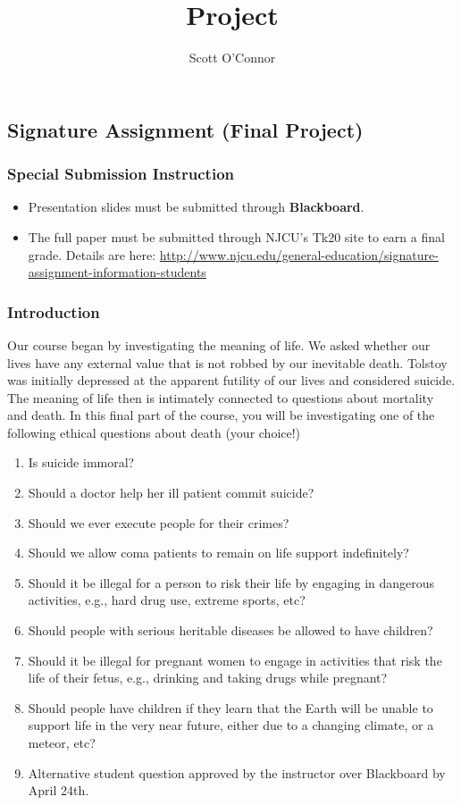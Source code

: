 \documentclass[]{article}
\title{Project}
\author{Scott O’Connor}
\providecommand{\tightlist}{%
  \setlength{\itemsep}{0pt}\setlength{\parskip}{0pt}}
\begin{document}
\subsection{Signature Assignment (Final
Project)}\label{signature-assignment-final-project}

\subsubsection{Special Submission
Instruction}\label{special-submission-instruction}

\begin{itemize}
\tightlist
\item
  Presentation slides must be submitted through \textbf{Blackboard}.
\item
  The full paper must be submitted through NJCU's Tk20 site to earn a
  final grade. Details are here:
  \url{http://www.njcu.edu/general-education/signature-assignment-information-students}
\end{itemize}

\subsubsection{Introduction}\label{introduction}

Our course began by investigating the meaning of life. We asked whether
our lives have any external value that is not robbed by our inevitable
death. Tolstoy was initially depressed at the apparent futility of our
lives and considered suicide. The meaning of life then is intimately
connected to questions about mortality and death. In this final part of
the course, you will be investigating one of the following ethical
questions about death (your choice!)

\begin{enumerate}
\def\labelenumi{\arabic{enumi}.}
\item
  Is suicide immoral?
\item
  Should a doctor help her ill patient commit suicide?
\item
  Should we ever execute people for their crimes?
\item
  Should we allow coma patients to remain on life support indefinitely?
\item
  Should it be illegal for a person to risk their life by engaging in
  dangerous activities, e.g., hard drug use, extreme sports, etc?
\item
  Should people with serious heritable diseases be allowed to have
  children?
\item
  Should it be illegal for pregnant women to engage in activities that
  risk the life of their fetus, e.g., drinking and taking drugs while
  pregnant?
\item
  Should people have children if they learn that the Earth will be
  unable to support life in the very near future, either due to a
  changing climate, or a meteor, etc?
\item
  Alternative student question approved by the instructor over
  Blackboard by April 24th.
\end{enumerate}
\end{document}
